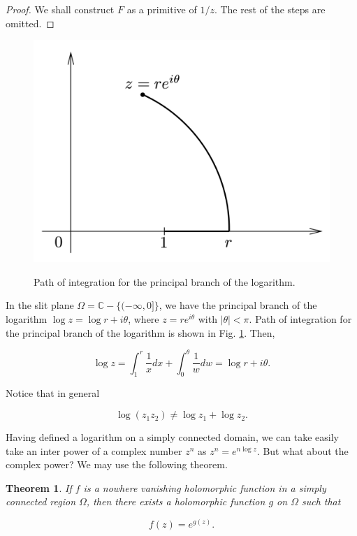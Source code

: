 \documentclass{article}
\newtheorem{theorem}{Theorem}
\begin{document}
\begin{proof}
We shall construct $F$ as a primitive of $1/z$. The rest of the steps are omitted.
\end{proof}

\begin{figure}
\centering
\includegraphics[scale=0.3]{principal_branch.png} \\
\caption{Path of integration for the principal branch of the logarithm.} 
\label{fig:principal_branch}
\end{figure}

In the slit plane $\Omega=\mathbb{C}-\{(-\infty,0]\}$, we have the principal branch of the logarithm $\log z=\log r+i\theta$, where $z=re^{i\theta}$ with $|\theta|<\pi$. Path of integration for the principal branch of the logarithm is shown in Fig. \ref{fig:principal_branch}. Then,

\begin{equation*}
\log z=\int^r_1\frac{1}{x}dx+\int^\theta_0\frac{1}{w}dw=\log r+i\theta.
\end{equation*}

Notice that in general 

\begin{equation*}
\log(z_1z_2)\neq\log z_1 +\log z_2.
\end{equation*}

Having defined a logarithm on a simply connected domain, we can take easily take an inter power of a complex number $z^n$ as $z^n=e^{n\log z}$. But what about the complex power? We may use the following theorem.

\begin{theorem}
If $f$ is a nowhere vanishing holomorphic function in a simply connected region $\Omega$, then there exists a holomorphic function $g$ on $\Omega$ such that 

\begin{equation*}
f(z)=e^{g(z)}.
\end{equation*}
\end{theorem}
\end{document}
